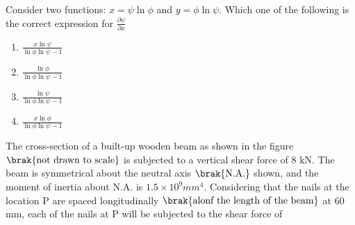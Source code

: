 \iffalse
  \title{GateAssignment6}
  \author{EE24BTECH11048-NITHIN.K}
  \section{ce}
  \chapter{2019}
\fi

\item Consider two functions: $x = \psi\ln{\phi}$ and $y = \phi\ln{\psi}$. Which one of the following is the correct expression for $\frac{\partial \psi}{\partial x}$
	\begin{enumerate}
		\item $\frac{x\ln{\psi}}{\ln{\phi}\ln{\psi} - 1}$
		\item $\frac{\ln{\phi}}{\ln{\phi}\ln{\psi} - 1}$
		\item $\frac{\ln{\psi}}{\ln{\phi}\ln{\psi} - 1}$
		\item $\frac{x\ln{\phi}}{\ln{\phi}\ln{\psi} - 1}$
	\end{enumerate}
\item The cross-section of a built-up wooden beam as shown in the figure $\brak{\text{not drawn to scale}}$ is subjected to a vertical shear force of 8 kN. The beam is symmetrical about the neutral axis $\brak{\text{N.A.}}$ shown, and the moment of inertia about N.A. is $1.5\times 10^9 {mm}^4$. Considering that the nails at the location P are spaced longitudinally $\brak{\text{alonf the length of the beam}}$ at 60 mm, each of the nails at P will be subjected to the shear force of
